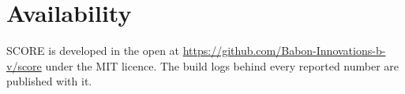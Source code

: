 \section{Availability}\label{availability}

SCORE is developed in the open at \url{https://github.com/Babon-Innovations-b-v/score} under the MIT licence. The build logs behind every reported number are published with it.

